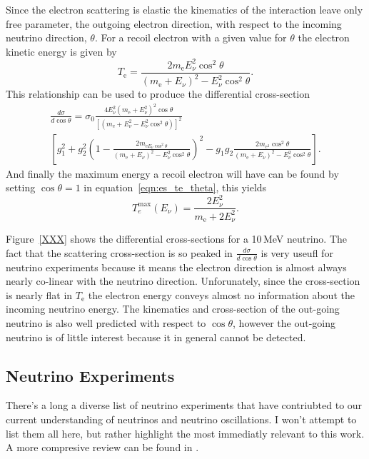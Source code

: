 Since the electron scattering is elastic the kinematics of the interaction
leave only free parameter, the outgoing electron direction, with respect
to the incoming neutrino direction, $\theta$.
For a recoil electron with a given value for $\theta$ the electron kinetic energy is
given by
\begin{equation}
    T_{\mathrm{e}}=\frac{2m_{\mathrm{e}}E_{\nu}^{2}\cos^{2}\theta}{(m_{\mathrm{e}}+E_{\nu})^2 - E_{\nu}^{2}\cos^2\theta}\text{.}
    \label{eqn:es_te_theta}
\end{equation}
This relationship can be used to produce the differential cross-section
\begin{multline}
    \frac{d\sigma}{d\cos\theta}=\sigma_{0}\frac{4E_{\nu}^{2}(m_{\mathrm{e}}+E_{\nu}^{2})^2\cos\theta}{\left[(m_{\mathrm{e}}+E_{\nu}^{2} -E_{\nu}^{2}\cos^2\theta)\right]^2}\\
    \left[g_{1}^{2} + g_{2}^{2}\left(1 - \frac{2m_{\mathrm{e}E_{\nu}\cos^{2}\theta}}{(m_{\mathrm{e}}+E_{\nu})^2 -E_{\nu}^{2}\cos^2\theta} \right)^{2} - g_{1}g_{2}\frac{2m_{\mathrm{e}^{2}}\cos^{2}\theta}{(m_{\mathrm{e}}+E_{\nu})^{2}-E_{\nu}^{2}\cos^{2}\theta}\right]
    \text{.}
\end{multline}
And finally the maximum energy a recoil electron will have can be found by
setting $\cos\theta=1$ in equation~\eqref{eqn:es_te_theta}, this yields
\begin{equation}
    T_{e}^{\max}(E_\nu) = \frac{2E_{\nu}^{2}}{m_{\mathrm{e}}+ 2E_{\nu}^{2} }\text{.}
\end{equation}

Figure~\ref{XXX} shows the differential cross-sections for a 10\,MeV neutrino.
The fact that the scattering cross-section is so peaked in $\frac{d\sigma}{d\cos\theta}$
is very useufl for neutrino experiments because it means the electron direction
is almost always nearly co-linear with the neutrino direction.
Unforunately, since the cross-section is nearly flat in $T_{\mathrm{e}}$
the electron energy conveys almost no information about the incoming neutrino
energy.
The kinematics and cross-section of the out-going neutrino is also
well predicted with respect to $\cos\theta$, however the out-going
neutrino is of little interest because it in general cannot be detected.


\subsection{Neutrino Experiments}
There's a long a diverse list of neutrino experiments that have contriubted to
our current understanding of neutrinos and neutrino oscillations.
I won't attempt to list them all here, but rather highlight the most immediatly
relevant to this work. A more compresive review can be found in \citep{FINDAREVIEW}.

